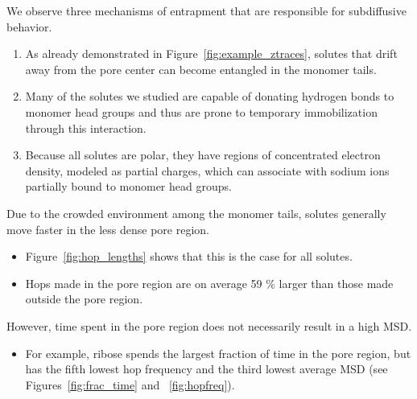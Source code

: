 \documentclass{article}
\begin{document}
  \noindent We observe three mechanisms of entrapment that are responsible for 
  subdiffusive behavior.
  \begin{enumerate}
    \item As already demonstrated in Figure~\ref{fig:example_ztraces}, solutes that
    drift away from the pore center can become entangled in the monomer tails. 
    \item Many of the solutes we studied are capable of donating hydrogen bonds to
    monomer head groups and thus are prone to temporary immobilization through this interaction.
    \item Because all solutes are polar, they have regions of concentrated electron
    density, modeled as partial charges, which can associate with sodium ions
    partially bound to monomer head groups.
  \end{enumerate}
  
  Due to the crowded environment among the monomer tails, solutes generally move faster
  in the less dense pore region.
  \begin{itemize}
    \item Figure~\ref{fig:hop_lengths} shows that this is the case for all solutes.
    \item Hops made in the pore region are on average 59 \% larger than those made
    outside the pore region.
  \end{itemize}
  
  However, time spent in the pore region does not necessarily result
  in a high MSD. 
  \begin{itemize}
    \item For example, ribose spends the largest fraction of time in 
    the pore region, but has the fifth lowest hop frequency and the third 
    lowest average MSD (see Figures~\ref{fig:frac_time} and ~\ref{fig:hopfreq}).
  \end{itemize}
  
\end{document}
